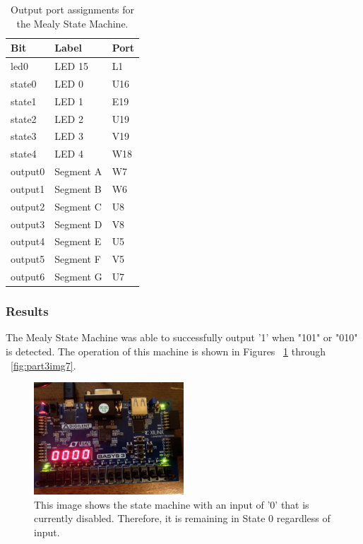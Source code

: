 \documentclass[11pt]{article}
\begin{document}
\begin{table}[H]
\begin{center}
\begin{tabular}{| l | l | l |}
	\hline
	Bit & Label & Port \\ \hline
	led0 & LED 15 & L1 \\ \hline
	state0 & LED 0 & U16 \\ \hline
	state1 & LED 1 & E19 \\ \hline
 	state2 & LED 2 & U19 \\ \hline
	state3 & LED 3 & V19 \\ \hline
	state4 & LED 4 & W18 \\ \hline
	output0 & Segment A & W7 \\ \hline
	output1 & Segment B & W6 \\ \hline
	output2 & Segment C & U8 \\ \hline
	output3 & Segment D & V8 \\ \hline
	output4 & Segment E & U5 \\ \hline
	output5 & Segment F & V5 \\ \hline
	output6 & Segment G & U7 \\ \hline
\end{tabular}
\caption{\label{tab:mealy_output_ports}Output port assignments for the Mealy State Machine.}
\end{center}
\end{table}

\subsubsection{Results}
The Mealy State Machine was able to successfully output '1' when "101" or "010" is detected. The operation of this machine is shown in Figures ~\ref{fig:part3img1} through ~\ref{fig:part3img7}.

\begin{center}
\begin{figure}[H]
	\includegraphics[width=0.5\textwidth]{./images/Part3/IMG_0583.jpg}
	\caption{\label{fig:part3img1}This image shows the state machine with an input of '0' that is currently disabled. Therefore, it is remaining in State 0 regardless of input.}
\end{figure}
\end{center}
\end{document}
